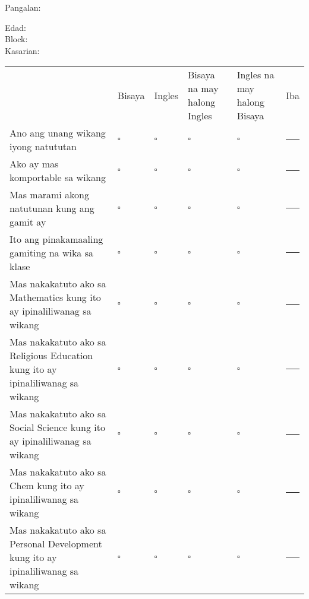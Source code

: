 \documentclass {article}
\begin{document}
Pangalan: \hrulefill

\begin{multicols}{4}
Edad: \hrulefill\\
Block: \hrulefill\\
Kasarian: \hrulefill\\
\end{multicols}

\setlength\extrarowheight{0.5cm}
\newcommand{\question}[1]{#1 & \(\square\) & \(\square\) & \(\square\) & \(\square\)
  & \hrule\\}
\begin{tabu} to 1\textwidth { X[2,l] X[1,c] X[1,c] X[1,c] X[1,c] X[1,c] }
  & Bisaya & Ingles & Bisaya na may halong Ingles & Ingles na may halong Bisaya & Iba \\
  \question {Ano ang unang wikang iyong natututan}
  \question {Ako ay mas komportable sa wikang}
  \question {Mas marami akong natutunan kung ang gamit ay}
  \question {Ito ang pinakamaaling gamiting na wika sa klase}
  \question {Mas nakakatuto ako sa Mathematics kung ito ay ipinaliliwanag sa wikang}
  \question {Mas nakakatuto ako sa Religious Education kung ito ay ipinaliliwanag sa wikang}
  \question {Mas nakakatuto ako sa Social Science kung ito ay ipinaliliwanag sa wikang}
  \question {Mas nakakatuto ako sa Chem kung ito ay ipinaliliwanag sa wikang}
  \question {Mas nakakatuto ako sa Personal Development kung ito ay ipinaliliwanag sa wikang}%
\end{tabu}

\end{document}

